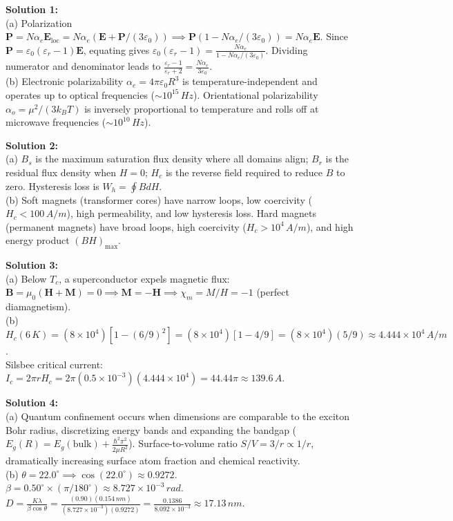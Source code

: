 \begin{solutionbox}
\textbf{Solution 1:}\\
(a) Polarization $\mathbf{P} = N \alpha_e \mathbf{E}_{\text{loc}} = N \alpha_e (\mathbf{E} + \mathbf{P}/(3\varepsilon_0)) \implies \mathbf{P}(1 - N\alpha_e/(3\varepsilon_0)) = N\alpha_e \mathbf{E}$. Since $\mathbf{P} = \varepsilon_0(\varepsilon_r-1)\mathbf{E}$, equating gives $\varepsilon_0(\varepsilon_r-1) = \frac{N\alpha_e}{1 - N\alpha_e/(3\varepsilon_0)}$. Dividing numerator and denominator leads to $\frac{\varepsilon_r - 1}{\varepsilon_r + 2} = \frac{N\alpha_e}{3\varepsilon_0}$.\\
(b) Electronic polarizability $\alpha_e = 4\pi\varepsilon_0 R^3$ is temperature-independent and operates up to optical frequencies ($\sim 10^{15}\,\si{Hz}$). Orientational polarizability $\alpha_o = \mu^2/(3k_B T)$ is inversely proportional to temperature and rolls off at microwave frequencies ($\sim 10^{10}\,\si{Hz}$).

\vspace{0.3cm}
\textbf{Solution 2:}\\
(a) $B_s$ is the maximum saturation flux density where all domains align; $B_r$ is the residual flux density when $H=0$; $H_c$ is the reverse field required to reduce $B$ to zero. Hysteresis loss is $W_h = \oint B dH$.\\
(b) Soft magnets (transformer cores) have narrow loops, low coercivity ($H_c < 100\,\si{A/m}$), high permeability, and low hysteresis loss. Hard magnets (permanent magnets) have broad loops, high coercivity ($H_c > 10^4\,\si{A/m}$), and high energy product $(BH)_{\text{max}}$.

\vspace{0.3cm}
\textbf{Solution 3:}\\
(a) Below $T_c$, a superconductor expels magnetic flux: $\mathbf{B} = \mu_0(\mathbf{H} + \mathbf{M}) = 0 \implies \mathbf{M} = -\mathbf{H} \implies \chi_m = M/H = -1$ (perfect diamagnetism).\\
(b) $H_c(6\,\si{K}) = (8 \times 10^4)[1 - (6/9)^2] = (8 \times 10^4)[1 - 4/9] = (8 \times 10^4)(5/9) \approx 4.444 \times 10^4\,\si{A/m}$.\\
Silsbee critical current: $I_c = 2\pi r H_c = 2\pi (0.5 \times 10^{-3})(4.444 \times 10^4) = 44.44\pi \approx 139.6\,\si{A}$.

\vspace{0.3cm}
\textbf{Solution 4:}\\
(a) Quantum confinement occurs when dimensions are comparable to the exciton Bohr radius, discretizing energy bands and expanding the bandgap ($E_g(R) = E_g(\text{bulk}) + \frac{\hbar^2\pi^2}{2\mu R^2}$). Surface-to-volume ratio $S/V = 3/r \propto 1/r$, dramatically increasing surface atom fraction and chemical reactivity.\\
(b) $\theta = 22.0^\circ \implies \cos(22.0^\circ) \approx 0.9272$. $\beta = 0.50^\circ \times (\pi/180^\circ) \approx 8.727 \times 10^{-3}\,\si{rad}$.\\
$D = \frac{K\lambda}{\beta\cos\theta} = \frac{(0.90)(0.154\,\si{nm})}{(8.727 \times 10^{-3})(0.9272)} = \frac{0.1386}{8.092 \times 10^{-3}} \approx 17.13\,\si{nm}$.
\end{solutionbox}
